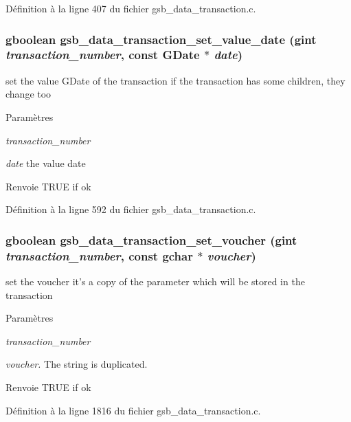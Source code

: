 Définition à la ligne 407 du fichier gsb\_\-data\_\-transaction.c.

\subsubsection[{gsb\_\-data\_\-transaction\_\-set\_\-value\_\-date}]{\setlength{\rightskip}{0pt plus 5cm}gboolean gsb\_\-data\_\-transaction\_\-set\_\-value\_\-date (gint {\em transaction\_\-number}, \/  const GDate $\ast$ {\em date})}\label{gsb__data__transaction_8h_a4c7ae911e47c4968dea14e48bafa34ff}
set the value GDate of the transaction if the transaction has some children, they change too


\begin{DoxyParams}{Paramètres}
\item[{\em transaction\_\-number}]\item[{\em date}]the value date\end{DoxyParams}
\begin{DoxyReturn}{Renvoie}
TRUE if ok 
\end{DoxyReturn}


Définition à la ligne 592 du fichier gsb\_\-data\_\-transaction.c.

\subsubsection[{gsb\_\-data\_\-transaction\_\-set\_\-voucher}]{\setlength{\rightskip}{0pt plus 5cm}gboolean gsb\_\-data\_\-transaction\_\-set\_\-voucher (gint {\em transaction\_\-number}, \/  const gchar $\ast$ {\em voucher})}\label{gsb__data__transaction_8h_a19ae235973c5bd3bbf35b25c12cc383e}
set the voucher it's a copy of the parameter which will be stored in the transaction 
\begin{DoxyParams}{Paramètres}
\item[{\em transaction\_\-number}]\item[{\em voucher.}]The string is duplicated. \end{DoxyParams}
\begin{DoxyReturn}{Renvoie}
TRUE if ok 
\end{DoxyReturn}


Définition à la ligne 1816 du fichier gsb\_\-data\_\-transaction.c.

